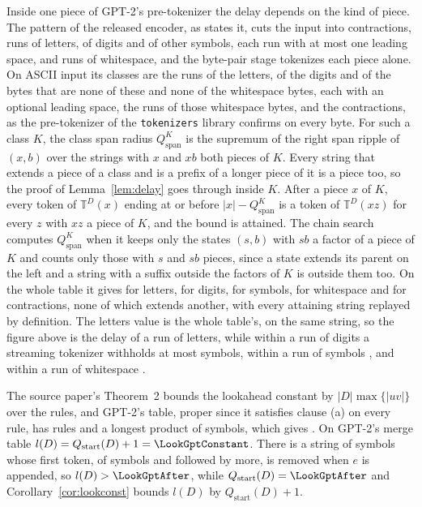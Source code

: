 \documentclass[11pt,a4paper]{article}
\theoremstyle{definition}
\theoremstyle{plain}
\newcommand{\code}[1]{\texttt{#1}}
\newcommand{\T}{\mathbb{T}}
\begin{document}
Inside one piece of GPT-2's pre-tokenizer the delay depends on the kind of piece. The pattern of the released encoder,
as \citet{nidhogg2026pretokenizer} states it, cuts the input into contractions, runs of letters, of digits and of other
symbols, each run with at most one leading space, and runs of whitespace, and the byte-pair stage tokenizes each piece
alone. On ASCII input its classes are the runs of the \ClassBytesLetters{} letters, of the \ClassBytesDigits{} digits
and of the \ClassBytesSymbols{} bytes that are none of these and none of the \ClassBytesWhitespace{} whitespace bytes,
each with an optional leading space, the runs of those whitespace bytes, and the \ClassContractionForms{} contractions,
as the pre-tokenizer of the \code{tokenizers} library confirms on every byte. For such a class \(K\), the class span
radius \(Q^K_{\mathrm{span}}\) is the supremum of the right span ripple of \((x, b)\) over the strings with \(x\) and
\(xb\) both pieces of \(K\). Every string that extends a piece of a class and is a prefix of a longer piece of it is a
piece too, so the proof of Lemma~\ref{lem:delay} goes through inside \(K\). After a piece \(x\) of \(K\), every token of
\(\T^D(x)\) ending at or before \(|x| - Q^K_{\mathrm{span}}\) is a token of \(\T^D(xz)\) for every \(z\) with \(xz\) a
piece of \(K\), and the bound is attained. The chain search computes \(Q^K_{\mathrm{span}}\) when it keeps only the
states \((s, b)\) with \(sb\) a factor of a piece of \(K\) and counts only those with \(s\) and \(sb\) pieces, since a
state extends its parent on the left and a string with a suffix outside the factors of \(K\) is outside them too. On the
whole table it gives \ClassRadiusLetters{} for letters, \ClassRadiusDigits{} for digits, \ClassRadiusSymbols{} for
symbols, \ClassRadiusWhitespace{} for whitespace and \ClassRadiusContractions{} for contractions, none of which extends
another, with every attaining string replayed by definition. The letters value is the whole table's, on the same string,
so the figure \ChainGptQspan{} above is the delay of a run of letters, while within a run of digits a streaming
tokenizer withholds at most \ClassRadiusDigits{} symbols, within a run of symbols \ClassRadiusSymbols{}, and within a
run of whitespace \ClassRadiusWhitespace{}.

The source paper's Theorem~2 bounds the lookahead constant by \(|D| \max \{|uv|\}\) over the rules, and GPT-2's table,
proper since it satisfies clause (a) on every rule, has \GptRules{} rules and a longest product of \LookGptLongest{}
symbols, which gives \LookGptBound{}. On GPT-2's merge table \(l(D) = Q_{\mathrm{start}}(D) + 1 = \LookGptConstant\).
There is a string of \LookGptString{} symbols whose first token, of \LookGptFirst{} symbols and followed by
\LookGptAfter{} more, is removed when \(e\) is appended, so \(l(D) > \LookGptAfter\), while
\(Q_{\mathrm{start}}(D) = \LookGptAfter\) and Corollary~\ref{cor:lookconst} bounds \(l(D)\) by
\(Q_{\mathrm{start}}(D) + 1\).
\end{document}
